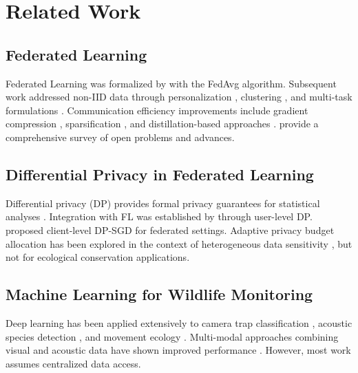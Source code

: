 \section{Related Work}

\label{sec:related}

\subsection{Federated Learning}

Federated Learning was formalized by \citet{mcmahan2017communication} with the FedAvg algorithm.
Subsequent work addressed non-IID data through personalization \citep{li2020federated}, clustering \citep{ghosh2020efficient}, and multi-task formulations \citep{smith2017federated}.
Communication efficiency improvements include gradient compression \citep{alistarh2017qsgd}, sparsification \citep{stich2018sparsified}, and distillation-based approaches \citep{lin2020ensemble}.
\citet{kairouz2021advances} provide a comprehensive survey of open problems and advances.

\subsection{Differential Privacy in Federated Learning}

Differential privacy (DP) provides formal privacy guarantees for statistical analyses \citep{dwork2014algorithmic}.
Integration with FL was established by \citet{mcmahan2018learning} through user-level DP.
\citet{geyer2017differentially} proposed client-level DP-SGD for federated settings.
Adaptive privacy budget allocation has been explored in the context of heterogeneous data sensitivity \citep{kang2020incentive}, but not for ecological conservation applications.

\subsection{Machine Learning for Wildlife Monitoring}

Deep learning has been applied extensively to camera trap classification \citep{norouzzadeh2018automatically, beery2019efficient}, acoustic species detection \citep{kahl2021birdnet, stowell2019automatic}, and movement ecology \citep{patterson2017statistical}.
Multi-modal approaches combining visual and acoustic data have shown improved performance \citep{verma2022towards}.
However, most work assumes centralized data access.

